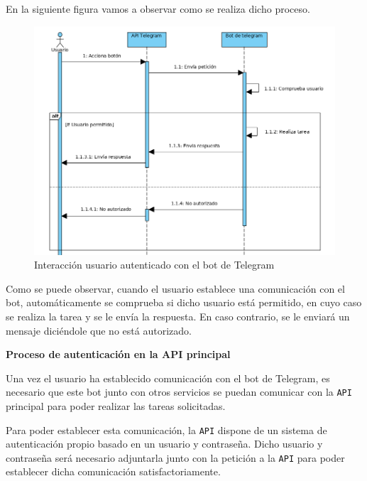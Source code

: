 En la siguiente figura vamos a observar como se realiza dicho proceso.

\begin{figure}[H]
	\centering
	\includegraphics[scale=0.6]{images/85}
	\caption{Interacción usuario autenticado con el bot de Telegram}
	\label{f:2}
\end{figure}

Como se puede observar, cuando el usuario establece una comunicación con el bot, automáticamente se comprueba si dicho usuario está permitido, en cuyo caso se realiza la tarea y se le envía la respuesta. En caso contrario, se le enviará un mensaje diciéndole que no está autorizado.

\textbf{Proceso de autenticación en la API principal}

Una vez el usuario ha establecido comunicación con el bot de Telegram, es necesario que este bot junto con otros servicios se puedan comunicar con la \texttt{API} principal para poder realizar las tareas solicitadas.

Para poder establecer esta comunicación, la \texttt{API} dispone de un sistema de autenticación propio basado en un usuario y contraseña. Dicho usuario y contraseña será necesario adjuntarla junto con la petición a la \texttt{API} para poder establecer dicha comunicación satisfactoriamente.


